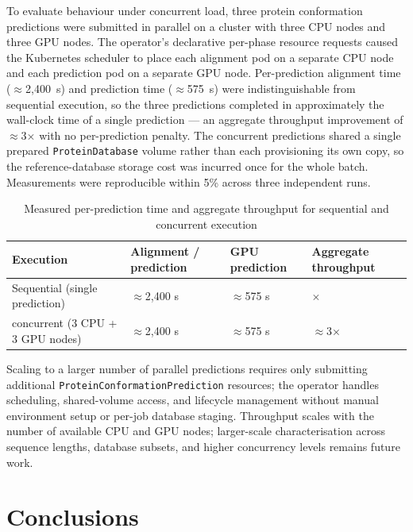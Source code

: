 To evaluate behaviour under concurrent load, three protein conformation predictions were submitted in parallel on a cluster with three CPU nodes and three GPU nodes. The operator's declarative per-phase resource requests caused the Kubernetes scheduler to place each alignment pod on a separate CPU node and each prediction pod on a separate GPU node. Per-prediction alignment time ($\approx$2{,}400~s) and prediction time ($\approx$575~s) were indistinguishable from sequential execution, so the three predictions completed in approximately the wall-clock time of a single prediction --- an aggregate throughput improvement of $\approx$3$\times$ with no per-prediction penalty. The concurrent predictions shared a single prepared \texttt{ProteinDatabase} volume rather than each provisioning its own copy, so the reference-database storage cost was incurred once for the whole batch. Measurements were reproducible within 5\% across three independent runs.

\begin{table}[H]
    \centering
    \caption{Measured per-prediction time and aggregate throughput for sequential and concurrent execution}
    \label{tab:concurrency_thesis}
    \small
    \begin{tabularx}{\textwidth}{|>{\centering\arraybackslash}X|>{\centering\arraybackslash}X|>{\centering\arraybackslash}X|>{\centering\arraybackslash}X|}
        \hline
        \textbf{Execution} & \textbf{Alignment / prediction} & \textbf{GPU prediction} & \textbf{Aggregate throughput} \\
        \hline
        Sequential (single prediction) & $\approx$2{,}400 s & $\approx$575 s & 1$\times$ \\
        \hline
        3 concurrent (3 CPU + 3 GPU nodes) & $\approx$2{,}400 s & $\approx$575 s & $\approx$3$\times$ \\
        \hline
    \end{tabularx}
\end{table}

Scaling to a larger number of parallel predictions requires only submitting additional \texttt{ProteinConformationPrediction} resources; the operator handles scheduling, shared-volume access, and lifecycle management without manual environment setup or per-job database staging. Throughput scales with the number of available CPU and GPU nodes; larger-scale characterisation across sequence lengths, database subsets, and higher concurrency levels remains future work.

\section{Conclusions}

